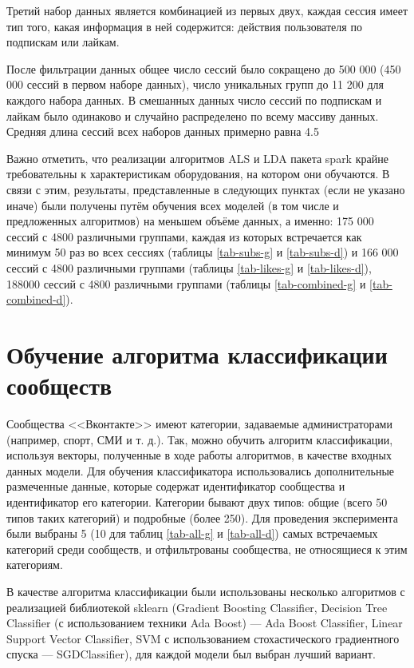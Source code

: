 \documentclass[times,specification,annotation]{itmo-student-thesis}
\begin{document}
Третий набор данных является комбинацией из первых двух, каждая сессия имеет тип того, какая информация в ней содержится: действия пользователя по подпискам или лайкам. 

После фильтрации данных общее число сессий было сокращено до 500 000 (450 000 сессий в первом наборе данных), число уникальных групп до 11 200 для каждого набора данных. В смешанных данных число сессий по подпискам и лайкам было одинаково и случайно распределено по всему массиву данных. Средняя длина сессий всех наборов данных примерно равна 4.5

Важно отметить, что реализации алгоритмов ALS и LDA пакета spark крайне требовательны к характеристикам оборудования, на котором они обучаются. В связи с этим, результаты, представленные в следующих пунктах (если не указано иначе) были получены путём обучения всех моделей (в том числе и предложенных алгоритмов) на меньшем объёме данных, а именно: 175 000 сессий с 4800 различными группами, каждая из которых встречается как минимум 50 раз во всех сессиях (таблицы  \ref{tab-subs-g} и \ref{tab-subs-d}) и 166 000 сессий с 4800 различными группами (таблицы \ref{tab-likes-g} и \ref{tab-likes-d}), 188000 сессий с 4800 различными группами (таблицы \ref{tab-combined-g} и \ref{tab-combined-d}). 

\section{Обучение алгоритма классификации сообществ}\label{sec:class}

Сообщества <<Вконтакте>> имеют категории, задаваемые администраторами
(например, спорт, СМИ и т. д.). Так, можно обучить алгоритм классификации,
используя векторы, полученные в ходе работы алгоритмов, в качестве входных
данных модели.  Для обучения классификатора использовались дополнительные размеченные данные, которые содержат идентификатор сообщества и идентификатор его категории. Категории бывают двух типов: общие (всего 50 типов таких категорий) и подробные (более 250). Для проведения эксперимента были выбраны 5 (10 для таблиц  \ref{tab-all-g} и  \ref{tab-all-d}) самых встречаемых категорий среди сообществ, и отфильтрованы сообщества, не относящиеся к этим категориям.

В качестве алгоритма классификации были использованы несколько алгоритмов с реализацией библиотекой sklearn (Gradient Boosting Classifier, Decision Tree Classifier (с использованием техники Ada Boost) --- Ada Boost Classifier, Linear Support Vector Classifier, SVM с использованием стохастического градиентного спуска --- SGDClassifier), для каждой модели был выбран лучший вариант. 
\end{document}
